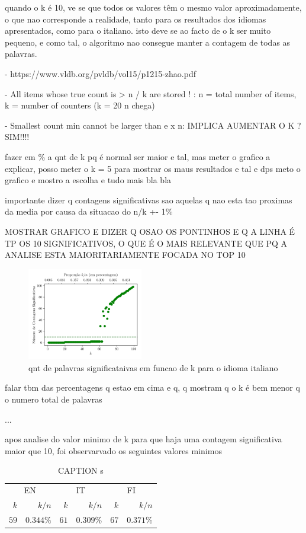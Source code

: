 \documentclass[mirror, portugues]{revdetua}
\begin{document}
quando o k é 10, ve se que todos os valores têm o mesmo valor aproximadamente, o que nao corresponde a realidade, tanto para os resultados dos idiomas apresentados, como para o italiano. isto deve se ao facto de o k ser muito pequeno, e como tal, o algoritmo nao consegue manter a contagem de todas as palavras.


- https://www.vldb.org/pvldb/vol15/p1215-zhao.pdf

- All items whose true count is > n / k are stored ! : n = total number of items, k = number of counters (k = 20 n chega)

- Smallest count min cannot be larger than e x n: IMPLICA AUMENTAR O K ? SIM!!!!

fazer em \% a qnt de k pq é normal ser maior e tal, mas meter o grafico a explicar, posso meter o k = 5 para mostrar os maus resultados e tal e dps meto o grafico e mostro a escolha e tudo mais bla bla

importante dizer q contagens significativas sao aquelas q nao esta tao proximas da media por causa da situacao do n/k +- 1\%

MOSTRAR GRAFICO E DIZER Q OSAO OS PONTINHOS E Q A LINHA É TP OS 10 SIGNIFICATIVOS, O QUE É O MAIS RELEVANTE QUE PQ A ANALISE ESTA MAIORITARIAMENTE FOCADA NO TOP 10

\begin{figure}[H]
    \centering
    \includegraphics[width=0.45\textwidth]{../assets/ss_signcount.png}
    \caption{qnt de palavras significataivas em funcao de k para o idioma italiano}
    \label{fig:meaningful_wordscount_k}
\end{figure}

falar tbm das percentagens q estao em cima e q, q mostram q o k é bem menor q o numero total de palavras

...

apos analise do valor minimo de k para que haja uma contagem significativa maior que 10, foi observarvado os seguintes valores minimos

\begin{table}[H]
\centering
\caption{CAPTION s}
\label{table:min_k_for_SStop10}
\begin{tabular}{rr|rr|rr}
\toprule
\multicolumn{2}{c}{EN} & \multicolumn{2}{c}{IT} & \multicolumn{2}{c}{FI} \\
$k$ & $k/n$ & $k$ & $k/n$ & $k$ & $k/n$ \\
\midrule
$59$ & $0.344\%$ & $61$ & $0.309\%$ & $67$ & $0.371\%$ \\
\bottomrule
\end{tabular}
\end{table}
\end{document}
